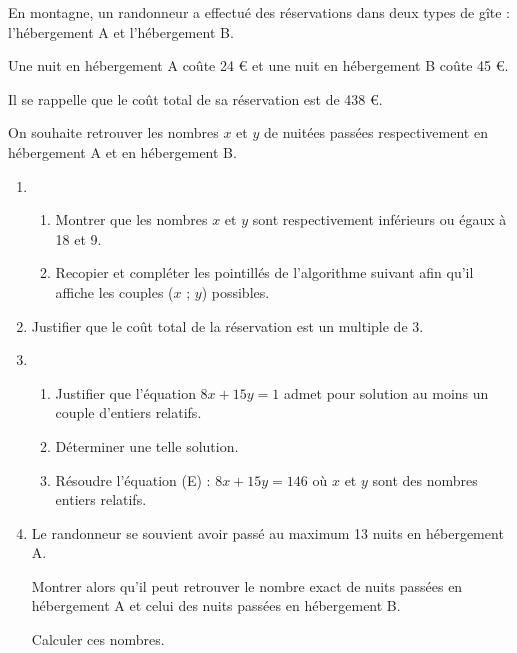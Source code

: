 \documentclass{cornouaille}
\begin{document}



\begin{exercice}
  En montagne, un randonneur a effectué des réservations dans deux
  types de gîte : l'hébergement A et l'hébergement B.

Une nuit en hébergement A coûte 24 \euro{} et une nuit en  hébergement B coûte 45 \euro{}.

Il se rappelle que le coût  total de sa réservation est de 438 \euro{}.\medskip
 
On souhaite retrouver les nombres $x$ et $y$ de nuitées passées respectivement en hébergement A et en  hébergement B.
\begin{enumerate}
\item \begin{enumerate}
\item Montrer que les nombres $x$ et $y$ sont respectivement inférieurs ou égaux à 18 et 9.		
\item Recopier et compléter les pointillés de l'algorithme suivant afin qu'il affiche les couples ($x$ ; $y$) possibles.

\begin{center}
\begin{algorithme}
\BlocVariables
{}
\BlocTraitementsEtAffichage
{}
\end{algorithme}
\end{center}
\end{enumerate}

\item Justifier que le coût total de la réservation est un multiple de 3.
\item \begin{enumerate}
\item Justifier que l'équation $8x + 15y = 1$ admet pour solution au moins un couple d'entiers relatifs.
\item Déterminer une telle solution.
\item Résoudre l'équation (E) : $8x + 15y = 146$ où $x$ et $y$ sont des nombres entiers relatifs.
\end{enumerate}
\item Le randonneur se souvient avoir passé au maximum 13 nuits en hébergement A.

Montrer alors qu'il peut retrouver le nombre exact de nuits passées en hébergement A et celui des nuits passées en hébergement B.

Calculer ces nombres.
\end{enumerate}
\end{exercice}
\end{document}
